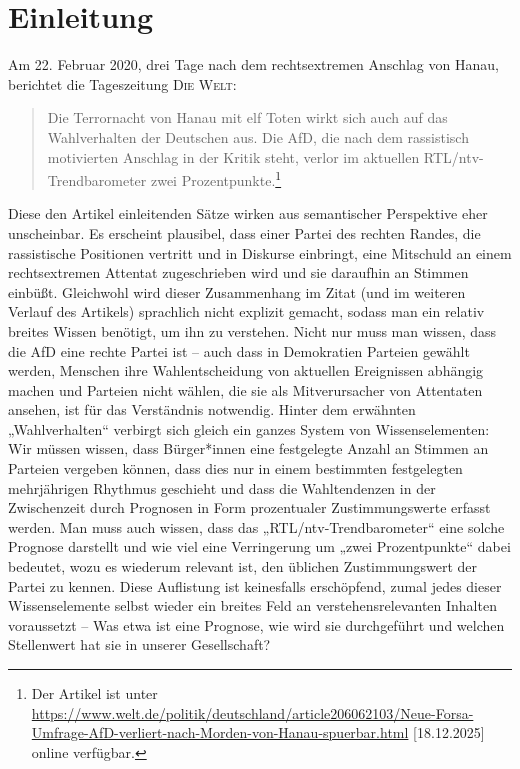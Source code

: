 \chapter{Einleitung}\label{einleitung}

Am 22. Februar 2020, drei Tage nach dem rechtsextremen Anschlag von Hanau, berichtet die Tageszeitung \textsc{Die} \textsc{Welt}:

\begin{quote}
Die Terrornacht von Hanau mit elf Toten wirkt sich auch auf das Wahlverhalten der Deutschen aus. Die AfD, die nach dem rassistisch motivierten Anschlag in der Kritik steht, verlor im aktuellen RTL/ntv-Trendbarometer zwei Prozentpunkte.\footnote{Der Artikel ist unter \url{https://www.welt.de/politik/deutschland/article206062103/Neue-Forsa-Umfrage-AfD-verliert-nach-Morden-von-Hanau-spuerbar.html} {[}18.12.2025{]} online verfügbar.}
\end{quote}

Diese den Artikel einleitenden Sätze wirken aus semantischer Perspektive eher unscheinbar. Es erscheint plausibel, dass einer Partei des rechten Randes, die rassistische Positionen vertritt und in Diskurse einbringt, eine Mitschuld an einem rechtsextremen Attentat zugeschrieben wird und sie daraufhin an Stimmen einbüßt. Gleichwohl wird dieser Zusammenhang im Zitat (und im weiteren Verlauf des Artikels) sprachlich nicht explizit gemacht, sodass man ein relativ breites Wissen benötigt, um ihn zu verstehen. Nicht nur muss man wissen, dass die AfD eine rechte Partei ist -- auch dass in Demokratien Parteien gewählt werden, Menschen ihre Wahlentscheidung von aktuellen Ereignissen abhängig machen und Parteien nicht wählen, die sie als Mitverursacher von Attentaten ansehen, ist für das Verständnis notwendig. Hinter dem erwähnten „Wahlverhalten`` verbirgt sich gleich ein ganzes System von Wissenselementen: Wir müssen wissen, dass Bürger*innen eine festgelegte Anzahl an Stimmen an Parteien vergeben können, dass dies nur in einem bestimmten festgelegten mehrjährigen Rhythmus geschieht und dass die Wahltendenzen in der Zwischenzeit durch Prognosen in Form prozentualer Zustimmungswerte erfasst werden. Man muss auch wissen, dass das „RTL/ntv-Trendbarometer`` eine solche Prognose darstellt und wie viel eine Verringerung um „zwei Prozentpunkte`` dabei bedeutet, wozu es wiederum relevant ist, den üblichen Zustimmungswert der Partei zu kennen. Diese Auflistung ist keinesfalls erschöpfend, zumal jedes dieser Wissenselemente selbst wieder ein breites Feld an verstehensrelevanten Inhalten voraussetzt -- Was etwa ist eine Prognose, wie wird sie durchgeführt und welchen Stellenwert hat sie in unserer Gesellschaft?

